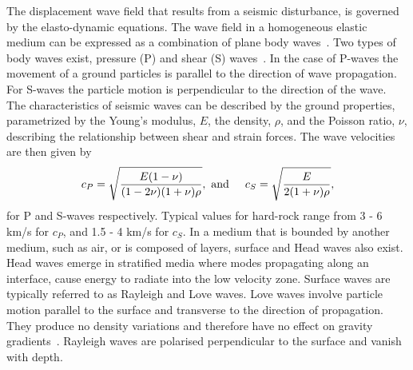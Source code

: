 The displacement wave field that results from a seismic disturbance, is governed by the elasto-dynamic equations. The wave field in a homogeneous elastic medium can be expressed as a combination of plane body waves~\cite{seismic_schevenels}. Two types of body waves exist, pressure (P) and shear (S) waves~\cite{seismic_achenbach}. In the case of P-waves the movement of a ground particles is parallel to the direction of wave propagation. For S-waves the particle motion is perpendicular to the direction of the wave. The characteristics of seismic waves can be described by the ground properties, parametrized by  the Young's modulus, $E$,  the density, $\rho$, and  the Poisson ratio, $\nu$, describing the relationship between shear and strain forces. The wave velocities are then given by
\begin{eqnarray}
	c_P = \sqrt{\frac{E(1-\nu)}{(1-2\nu)(1+\nu)\rho}},\mbox{ and} \hspace{0.5cm} c_S = \sqrt{\frac{E}{2(1+\nu)\rho}},
	\label{eq3.38}
\end{eqnarray}
for P and S-waves respectively. Typical values for hard-rock range from 3 - 6 km/s for $c_P$, and 1.5 - 4 km/s for $c_S$. In a medium that is bounded by another medium, such as air, or is composed of layers, surface and Head waves also exist. Head waves emerge in stratified media where modes propagating along an interface, cause energy to radiate into the low velocity zone. Surface waves are typically referred to as Rayleigh and Love waves. Love waves involve particle motion parallel to the surface and transverse to the direction of propagation. They produce no density variations and therefore have no effect on gravity gradients~\cite{GGThorne}. Rayleigh waves are polarised perpendicular to the surface and vanish with depth.

